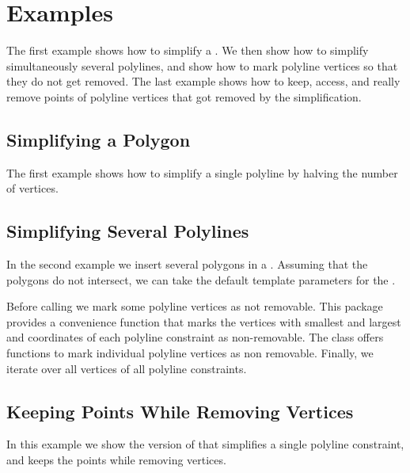 \newpage
\section{Examples}

The first example shows how to simplify a .  We then show
how to simplify simultaneously several polylines, and show how to mark polyline vertices
so that they do not get removed. The last example shows how to keep, access,
and really remove points of polyline vertices that got removed by the simplification.

\subsection{Simplifying a Polygon}

The first example shows how to simplify a single polyline by halving the number of vertices.


\newpage
\subsection{Simplifying Several Polylines}

In the second example we insert several polygons in a .  Assuming that the polygons do not intersect, we can
take the default template parameters for the .

Before calling  we mark some polyline vertices as not
removable.
This package provides a convenience function  that marks
the vertices with smallest and largest  and  coordinates
of each polyline constraint as non-removable.
The class 
offers functions to mark individual polyline vertices as non removable.
Finally, we iterate over all vertices of all polyline constraints.


\newpage
\subsection{Keeping Points While Removing Vertices}

In this example we show the version of 
that simplifies a single polyline constraint, and keeps
the points while removing vertices.

